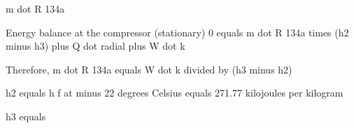 m dot R 134a

Energy balance at the compressor (stationary)
0 equals m dot R 134a times (h2 minus h3) plus Q dot radial plus W dot k

Therefore, m dot R 134a equals W dot k divided by (h3 minus h2)

h2 equals h f at minus 22 degrees Celsius equals 271.77 kilojoules per kilogram

h3 equals